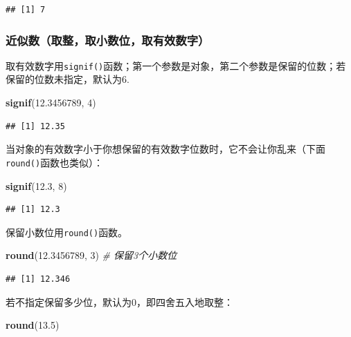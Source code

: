 \documentclass[]{book}
\newenvironment{Shaded}{\begin{snugshade}}{\end{snugshade}}
\newcommand{\CommentTok}[1]{\textcolor[rgb]{0.56,0.35,0.01}{\textit{#1}}}
\newcommand{\DecValTok}[1]{\textcolor[rgb]{0.00,0.00,0.81}{#1}}
\newcommand{\FloatTok}[1]{\textcolor[rgb]{0.00,0.00,0.81}{#1}}
\newcommand{\KeywordTok}[1]{\textcolor[rgb]{0.13,0.29,0.53}{\textbf{#1}}}
\newcommand{\NormalTok}[1]{#1}
\begin{document}
\begin{verbatim}
## [1] 7
\end{verbatim}

\hypertarget{quzheng}{%
\subsubsection{近似数（取整，取小数位，取有效数字）}\label{quzheng}}

取有效数字用\texttt{signif()}函数；第一个参数是对象，第二个参数是保留的位数；若保留的位数未指定，默认为6.

\begin{Shaded}
\begin{Highlighting}[]
\KeywordTok{signif}\NormalTok{(}\FloatTok{12.3456789}\NormalTok{, }\DecValTok{4}\NormalTok{)}
\end{Highlighting}
\end{Shaded}

\begin{verbatim}
## [1] 12.35
\end{verbatim}

当对象的有效数字小于你想保留的有效数字位数时，它不会让你乱来（下面\texttt{round()}函数也类似）：

\begin{Shaded}
\begin{Highlighting}[]
\KeywordTok{signif}\NormalTok{(}\FloatTok{12.3}\NormalTok{, }\DecValTok{8}\NormalTok{)}
\end{Highlighting}
\end{Shaded}

\begin{verbatim}
## [1] 12.3
\end{verbatim}

保留小数位用\texttt{round()}函数。

\begin{Shaded}
\begin{Highlighting}[]
\KeywordTok{round}\NormalTok{(}\FloatTok{12.3456789}\NormalTok{, }\DecValTok{3}\NormalTok{) }\CommentTok{# 保留3个小数位}
\end{Highlighting}
\end{Shaded}

\begin{verbatim}
## [1] 12.346
\end{verbatim}

若不指定保留多少位，默认为0，即四舍五入地取整：

\begin{Shaded}
\begin{Highlighting}[]
\KeywordTok{round}\NormalTok{(}\FloatTok{13.5}\NormalTok{)}
\end{Highlighting}
\end{Shaded}
\end{document}
